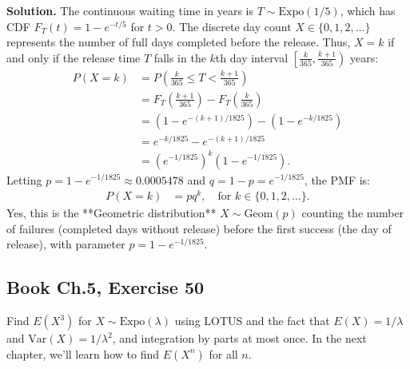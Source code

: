 \documentclass[11pt,a4paper]{article}
\begin{document}
\noindent \textbf{Solution.} The continuous waiting time in years is $T \sim \text{Expo}(1/5)$, which has CDF $F_T(t) = 1 - e^{-t/5}$ for $t > 0$. The discrete day count $X \in \{0, 1, 2, \dots\}$ represents the number of full days completed before the release. Thus, $X = k$ if and only if the release time $T$ falls in the $k$th day interval $\left[ \frac{k}{365}, \frac{k+1}{365} \right)$ years:
\begin{align*}
P(X = k) &= P\left( \frac{k}{365} \le T < \frac{k+1}{365} \right) \\
&= F_T\left(\frac{k+1}{365}\right) - F_T\left(\frac{k}{365}\right) \\
&= \left( 1 - e^{-(k+1)/1825} \right) - \left( 1 - e^{-k/1825} \right) \\
&= e^{-k/1825} - e^{-(k+1)/1825} \\
&= \left( e^{-1/1825} \right)^k \left( 1 - e^{-1/1825} \right).
\end{align*}
Letting $p = 1 - e^{-1/1825} \approx 0.0005478$ and $q = 1 - p = e^{-1/1825}$, the PMF is:
\begin{align*}
P(X = k) &= p q^k, \quad \text{for } k \in \{0, 1, 2, \dots\}.
\end{align*}
Yes, this is the **Geometric distribution** $X \sim \text{Geom}(p)$ counting the number of failures (completed days without release) before the first success (the day of release), with parameter $p = 1 - e^{-1/1825}$.

\vspace{10pt}
\subsection{Book Ch.5, Exercise 50}
\begin{tcolorbox}[title={Book Ch.5, Exercise 50}]
Find $E(X^3)$ for $X \sim \text{Expo}(\lambda)$ using LOTUS and the fact that $E(X) = 1/\lambda$ and $\text{Var}(X) = 1/\lambda^2$, and integration by parts at most once. In the next chapter, we'll learn how to find $E(X^n)$ for all $n$.
\end{tcolorbox}
\end{document}
